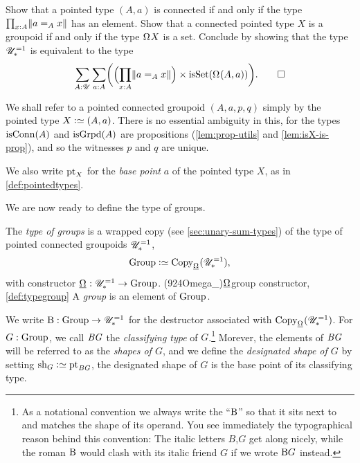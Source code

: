 \begin{xca}\label{xca:defgroup}
  Show that a pointed type $(A,a)$ is connected if and only if the type $\prod_{x:A}\lVert a =_A x\rVert$ has an element.
  Show that a connected pointed type $X$ is a groupoid if and only if the type $\loops X$ is a set.
  Conclude by showing that the type ${\mathscr{U}}_\ast^{=1}$ is equivalent to the type
  \[
    \sum_{A:\UU} \sum_{a:A} \biggl( \Bigl( \prod_{x:A}\Trunc{a =_A x} \Bigr)
      \times \isset( \loops (A,a) ) \biggr).\qedhere
  \]
\end{xca}

\begin{remark}
  We shall refer to a pointed connected groupoid $(A,a,p,q)$ simply
  by the pointed type $X \defeq (A,a)$.
  There is no essential ambiguity in this, for
  the types $\isconn(A)$ and $\isgrpd(A)$ are propositions (\cref{lem:prop-utils} and \cref{lem:isX-is-prop}),
  and so the witnesses $p$ and $q$ are unique.

  We also write $\mathrm{pt}_X$ for the \emph{base point} $a$ of the pointed type $X$, as in \cref{def:pointedtypes}.
\end{remark}

We are now ready to define the type of groups.

\begin{definition}\label{def:typegroup}
  The \emph{type of groups} is a wrapped copy (see \cref{sec:unary-sum-types})
  of the type of pointed connected groupoids ${\mathscr{U}}_\ast^{=1}$,
  \[
    \typegroup \defequi \Copy_{\mkgroup}(\UUscone),
  \]
  with constructor $\mkgroup : \UUscone \to \Group$.%
  \glossary(924Omega_){$\protect\mkgroup$}{group constructor, \cref{def:typegroup}}
  A \emph{group} is an element of $\mathrm{Group}$.
\end{definition}

\begin{definition}\label{def:classifying-type}
  We write $\mathrm{B} : \mathrm{Group} \to {\mathscr{U}}_\ast^{=1}$ for the
  destructor associated with $\Copy_{\mkgroup}(\UUscone)$.
  For $G : \mathrm{Group}$,
  we call $\mathit{B}\mathit{G}$ the \emph{classifying type} of $G$.\footnote{%
    As a notational convention we always write the ``$\mathrm{B}$''
    so that it sits next to and matches the shape
    of its operand.
    You see immediately the typographical reason behind this convention:
    The italic letters $B$,$G$ get along nicely,
    while the roman $\mathrm{B}$ would clash with its italic friend $G$
    if we wrote $\mathrm{B} G$ instead.}
  Morever, the elements of $\mathit{B}\mathit{G}$ will be referred to as the \emph{shapes of $G$},
  and we define the \emph{designated shape of $G$} by setting
  $\shape_G\defequi \pt_{\BG}$,
  \ie the designated shape of $G$ is the base point of its
  classifying type.
\end{definition}

